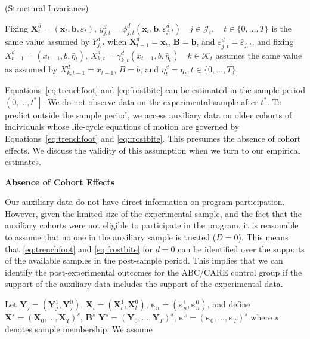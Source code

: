 \begin{assumption}\label{ass:butts}
(Structural Invariance)\\
\begin{spacing}{1.5}
\noindent Fixing $\bm{X}^d_t = (\bm{x}_t, \bm{b},\bar{\varepsilon}_t)$, $y^d_{j,t} = \phi^d_{j,t} (\bm{x}_t, \bm{b},  \bar{\varepsilon}^d_{j,t}) \quad j \in \mathcal{J}_t, \quad t \in \{0,\ldots,T\}$ is the same value assumed by $Y^d_{j,t}$ when $\bm{X}^d_{t-1} = \bm{x}_t$, $\bm{B} = \bm{b}$, and $\varepsilon^d_{j,t} = \bar{\varepsilon}_{j,t}$, and fixing $X^d_{t-1} = (x_{t-1}, b, \bar{\eta}_t)$, $X^d_{k,t} = \gamma^d_{k,t} (x_{t-1}, b, \bar{\eta}_t) \quad k \in \mathcal{K}_t$ assumes the same value as assumed by $X^d_{k,t-1} = x_{t-1}$, $B = b$, and $\eta^d_t = \bar{\eta}_t, t \in \{0,\dots,T\}$.
\end{spacing}
\end{assumption}

Equations~\eqref{eq:trenchfoot} and \eqref{eq:frostbite} can be estimated in the sample period $\left(0,\ldots,t^{*}\right]$. We do not observe data on the experimental sample after $t^{*}$. To predict outside the sample period, we access auxiliary data on older cohorts of individuals whose life-cycle equations of motion are governed by Equations~\eqref{eq:trenchfoot} and \eqref{eq:frostbite}. This presumes the absence of cohort effects. We discuss the validity of this assumption when we turn to our empirical estimates.

\begin{assumption}\label{ass:crotchrot}
\textbf{Absence of Cohort Effects}
\end{assumption}

Our auxiliary data do not have direct information on program participation. However, given the limited size of the experimental sample, and the fact that the auxiliary cohorts were not eligible to participate in the program, it is reasonable to assume that no one in the auxiliary sample is treated ($D=0$). This means that \eqref{eq:trenchfoot} and \eqref{eq:frostbite} for $d=0$ can be identified over the supports of the available samples in the post-sample period. This implies that we can identify the post-experimental outcomes for the ABC/CARE control group if the support of the auxiliary data includes the support of the experimental data.

Let $\bm{Y}_j = (\bm{Y}^1_j, \bm{Y}^0_j)$, $\bm{X}_l = (\bm{X}^1_l, \bm{X}^0_l)$, $\bm{\varepsilon}_n = (\bm{\varepsilon}^1_n, \bm{\varepsilon}^0_n)$, and define $\bm{X}^s = (\bm{X}_0,\dots,\bm{X}_T)^s$, $\bm{B}^s$ $\bm{Y}^s = (\bm{Y}_0,\dots,\bm{Y}_T)^s$, $\bm{\varepsilon}^s = (\bm{\varepsilon}_0,\dots,\bm{\varepsilon}_{T})^s$ where $s$ denotes sample membership. We assume


